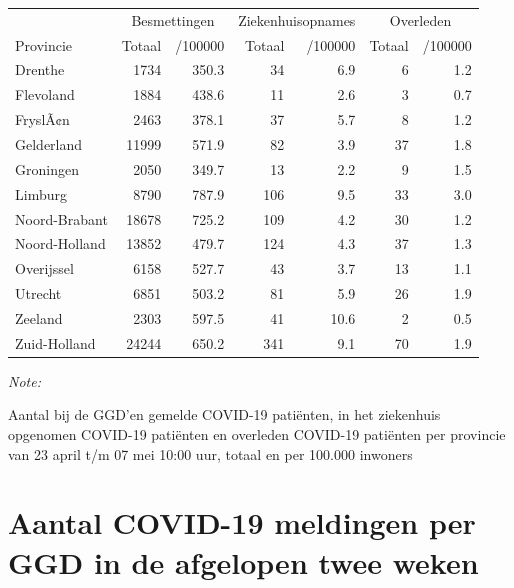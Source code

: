 \documentclass[
  english,
  man,floatsintext]{apa6}
\begin{document}
\begin{table}
\centering
\begin{threeparttable}
\begin{tabular}{lrrrrrr}
\toprule
\multicolumn{1}{c}{ } & \multicolumn{2}{c}{Besmettingen} & \multicolumn{2}{c}{Ziekenhuisopnames} & \multicolumn{2}{c}{Overleden} \\
\cmidrule(l{3pt}r{3pt}){2-3} \cmidrule(l{3pt}r{3pt}){4-5} \cmidrule(l{3pt}r{3pt}){6-7}
Provincie & Totaal & /100000 & Totaal & /100000 & Totaal & /100000\\
\midrule
Drenthe & 1734 & 350.3 & 34 & 6.9 & 6 & 1.2\\
Flevoland & 1884 & 438.6 & 11 & 2.6 & 3 & 0.7\\
FryslÃ¢n & 2463 & 378.1 & 37 & 5.7 & 8 & 1.2\\
Gelderland & 11999 & 571.9 & 82 & 3.9 & 37 & 1.8\\
Groningen & 2050 & 349.7 & 13 & 2.2 & 9 & 1.5\\
Limburg & 8790 & 787.9 & 106 & 9.5 & 33 & 3.0\\
Noord-Brabant & 18678 & 725.2 & 109 & 4.2 & 30 & 1.2\\
Noord-Holland & 13852 & 479.7 & 124 & 4.3 & 37 & 1.3\\
Overijssel & 6158 & 527.7 & 43 & 3.7 & 13 & 1.1\\
Utrecht & 6851 & 503.2 & 81 & 5.9 & 26 & 1.9\\
Zeeland & 2303 & 597.5 & 41 & 10.6 & 2 & 0.5\\
Zuid-Holland & 24244 & 650.2 & 341 & 9.1 & 70 & 1.9\\
\bottomrule
\end{tabular}
\begin{tablenotes}
\item \textit{Note: } 
\item Aantal bij de GGD’en gemelde COVID-19 patiënten, in het ziekenhuis opgenomen COVID-19 patiënten en overleden COVID-19 patiënten per provincie van 23 april t/m 07 mei 10:00 uur, totaal en per 100.000 inwoners
\end{tablenotes}
\end{threeparttable}
\end{table}

\newpage

\hypertarget{aantal-covid-19-meldingen-per-ggd-in-de-afgelopen-twee-weken}{%
\section{Aantal COVID-19 meldingen per GGD in de afgelopen twee weken}\label{aantal-covid-19-meldingen-per-ggd-in-de-afgelopen-twee-weken}}
\end{document}
